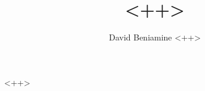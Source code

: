 \documentclass{article}
\author{David Beniamine <++>}
\title{<++> }
\begin{document}
\maketitle
\begin{center}
    \tableofcontentss
\end{center}
\newpage

<++>

%

\end{document}
